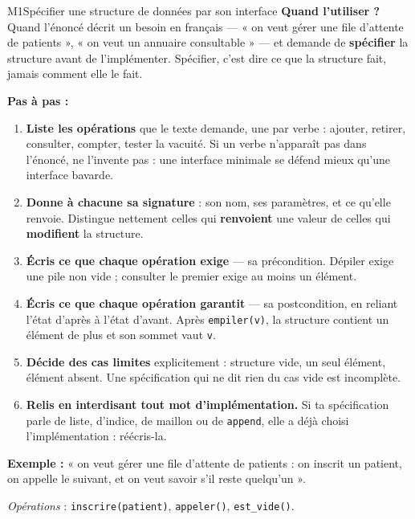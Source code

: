\begin{fichemethode}{M1}{Spécifier une structure de données par son interface}
\textbf{Quand l'utiliser ?} Quand l'énoncé décrit un besoin en français — « on veut gérer une
file d'attente de patients », « on veut un annuaire consultable » — et demande de
\textbf{spécifier} la structure avant de l'implémenter. Spécifier, c'est dire ce que la
structure fait, jamais comment elle le fait.

\textbf{Pas à pas :}
\begin{enumerate}
  \item \textbf{Liste les opérations} que le texte demande, une par verbe : ajouter,
    retirer, consulter, compter, tester la vacuité. Si un verbe n'apparaît pas dans l'énoncé,
    ne l'invente pas : une interface minimale se défend mieux qu'une interface bavarde.
  \item \textbf{Donne à chacune sa signature} : son nom, ses paramètres, et ce qu'elle
    renvoie. Distingue nettement celles qui \textbf{renvoient} une valeur de celles qui
    \textbf{modifient} la structure.
  \item \textbf{Écris ce que chaque opération exige} — sa précondition. Dépiler exige une pile
    non vide ; consulter le premier exige au moins un élément.
  \item \textbf{Écris ce que chaque opération garantit} — sa postcondition, en reliant l'état
    d'après à l'état d'avant. Après \lstinline{empiler(v)}, la structure contient un élément de
    plus et son sommet vaut \lstinline{v}.
  \item \textbf{Décide des cas limites} explicitement : structure vide, un seul élément,
    élément absent. Une spécification qui ne dit rien du cas vide est incomplète.
  \item \textbf{Relis en interdisant tout mot d'implémentation.} Si ta spécification parle de
    liste, d'indice, de maillon ou de \lstinline{append}, elle a déjà choisi
    l'implémentation : réécris-la.
\end{enumerate}

\textbf{Exemple :} « on veut gérer une file d'attente de patients : on inscrit un patient, on
appelle le suivant, et on veut savoir s'il reste quelqu'un ».

\emph{Opérations} : \lstinline{inscrire(patient)}, \lstinline{appeler()},
\lstinline{est_vide()}.


\end{fichemethode}
